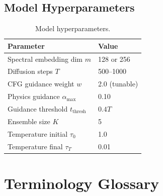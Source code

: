 \documentclass[12pt,a4paper]{article}
\newcommand{\tthresh}{t_{\mathrm{thresh}}}
\newcommand{\alphamax}{\alpha_{\max}}
\theoremstyle{definition}
\theoremstyle{plain}
\theoremstyle{remark}
\begin{document}
\subsection{Model Hyperparameters}

\begin{table}[H]
\centering
\caption{Model hyperparameters.}
\label{tab:app_hyper}
\begin{tabular}{ll}
\toprule
\textbf{Parameter} & \textbf{Value} \\
\midrule
Spectral embedding dim $m$     & 128 or 256 \\
Diffusion steps $T$             & 500--1000 \\
CFG guidance weight $w$         & 2.0 (tunable) \\
Physics guidance $\alphamax$    & 0.10 \\
Guidance threshold $\tthresh$   & $0.4T$ \\
Ensemble size $K$               & 5 \\
Temperature initial $\tau_0$    & 1.0 \\
Temperature final $\tau_T$      & 0.01 \\
\bottomrule
\end{tabular}
\end{table}

\section{Terminology Glossary}
\label{app:glossary}
\end{document}
